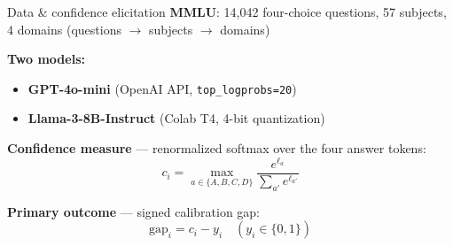 \documentclass[aspectratio=169,11pt]{beamer}
\begin{document}
\begin{frame}{Data \& confidence elicitation}
\textbf{MMLU}: 14{,}042 four-choice questions, 57 subjects, 4 domains
\hfill{\small\color{mgray}(questions $\to$ subjects $\to$ domains)}

\vspace{1em}
\textbf{Two models:}
\begin{itemize}
  \item \textbf{GPT-4o-mini} (OpenAI API, \texttt{top\_logprobs=20})
  \item \textbf{Llama-3-8B-Instruct} (Colab T4, 4-bit quantization)
\end{itemize}

\vspace{1em}
\textbf{Confidence measure} — renormalized softmax over the four answer tokens:
\[
  c_i = \max_{a \in \{A,B,C,D\}} \frac{e^{\ell_a}}{\sum_{a'} e^{\ell_{a'}}}
\]

\vspace{0.5em}
\textbf{Primary outcome} — signed calibration gap:
\[
  \mathrm{gap}_i = c_i - y_i \quad (y_i \in \{0,1\})
\]
\end{frame}
\end{document}

